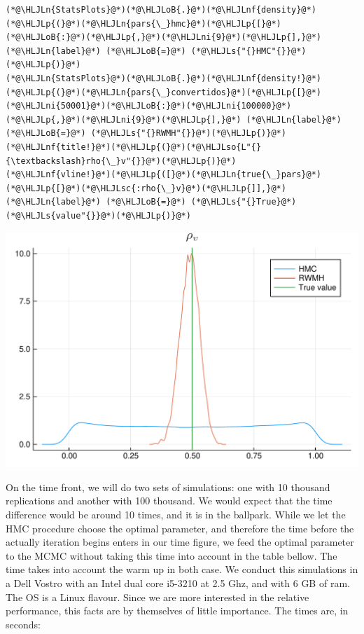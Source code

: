 \documentclass[12pt,a4paper]{article}
\newcommand{\HLJLn}[1]{#1}
\newcommand{\HLJLnf}[1]{\textcolor[RGB]{66,102,213}{#1}}
\newcommand{\HLJLs}[1]{\textcolor[RGB]{201,61,57}{#1}}
\newcommand{\HLJLsc}[1]{\textcolor[RGB]{201,61,57}{#1}}
\newcommand{\HLJLso}[1]{\textcolor[RGB]{201,61,57}{#1}}
\newcommand{\HLJLni}[1]{\textcolor[RGB]{59,151,46}{#1}}
\newcommand{\HLJLoB}[1]{\textcolor[RGB]{102,102,102}{\textbf{#1}}}
\newcommand{\HLJLp}[1]{#1}
\begin{document}
\begin{lstlisting}
(*@\HLJLn{StatsPlots}@*)(*@\HLJLoB{.}@*)(*@\HLJLnf{density}@*)(*@\HLJLp{(}@*)(*@\HLJLn{pars{\_}hmc}@*)(*@\HLJLp{[}@*)(*@\HLJLoB{:}@*)(*@\HLJLp{,}@*)(*@\HLJLni{9}@*)(*@\HLJLp{],}@*) (*@\HLJLn{label}@*) (*@\HLJLoB{=}@*) (*@\HLJLs{"{}HMC"{}}@*)(*@\HLJLp{)}@*)
(*@\HLJLn{StatsPlots}@*)(*@\HLJLoB{.}@*)(*@\HLJLnf{density!}@*)(*@\HLJLp{(}@*)(*@\HLJLn{pars{\_}convertidos}@*)(*@\HLJLp{[}@*)(*@\HLJLni{50001}@*)(*@\HLJLoB{:}@*)(*@\HLJLni{100000}@*)(*@\HLJLp{,}@*)(*@\HLJLni{9}@*)(*@\HLJLp{],}@*) (*@\HLJLn{label}@*) (*@\HLJLoB{=}@*) (*@\HLJLs{"{}RWMH"{}}@*)(*@\HLJLp{)}@*)
(*@\HLJLnf{title!}@*)(*@\HLJLp{(}@*)(*@\HLJLso{L"{}{\textbackslash}rho{\_}v"{}}@*)(*@\HLJLp{)}@*)
(*@\HLJLnf{vline!}@*)(*@\HLJLp{([}@*)(*@\HLJLn{true{\_}pars}@*)(*@\HLJLp{[}@*)(*@\HLJLsc{:rho{\_}v}@*)(*@\HLJLp{]],}@*) (*@\HLJLn{label}@*) (*@\HLJLoB{=}@*) (*@\HLJLs{"{}True}@*) (*@\HLJLs{value"{}}@*)(*@\HLJLp{)}@*)
\end{lstlisting}

\includegraphics[width=\linewidth]{figures/dsge_and_julia_52_1.pdf}

On the time front, we will do two sets of simulations: one with 10 thousand replications and another with 100 thousand. We would expect that the time difference would be around 10 times, and it is in the ballpark. While we let the HMC procedure choose the optimal parameter, and therefore the time before the actually iteration begins enters in our time figure, we feed the optimal parameter to the MCMC without taking this time into account in the table bellow. The time takes into account the warm up in both case. We conduct this simulations in a Dell Vostro with an Intel dual core i5-3210 at 2.5 Ghz, and with 6 GB of ram. The OS is a Linux flavour. Since we are more interested in the relative performance, this facts are by themselves of little importance. The times are, in seconds:
\end{document}
